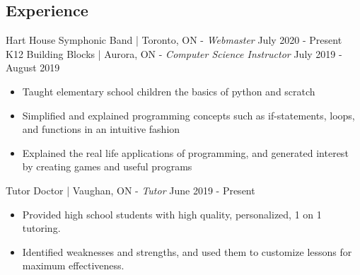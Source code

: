 \documentclass[letter]{res}
\begin{document}
\begin{resume}
    \section{Experience}
    Hart House Symphonic Band | Toronto, ON \newline - {\sl Webmaster} \hfill July 2020 - Present\\
    K12 Building Blocks | Aurora, ON \newline - {\sl Computer Science Instructor} \hfill July 2019 - August 2019\\
    \vspace{-2mm}
    \begin{itemize}
        \item Taught elementary school children the basics of python and scratch
        \item Simplified and explained programming concepts such as if-statements, loops, and functions in an intuitive fashion
        \item Explained the real life applications of programming, and generated interest by creating games and useful programs
    \end{itemize}
    Tutor Doctor | Vaughan, ON \newline - {\sl Tutor} \hfill June 2019 - Present\\
    \vspace{-2mm}
    \begin{itemize}
        \item Provided high school students with high quality, personalized, 1 on 1 tutoring.
        \item Identified weaknesses and strengths, and used them to customize lessons for maximum effectiveness.
    \end{itemize}


\end{resume}
\end{document}

